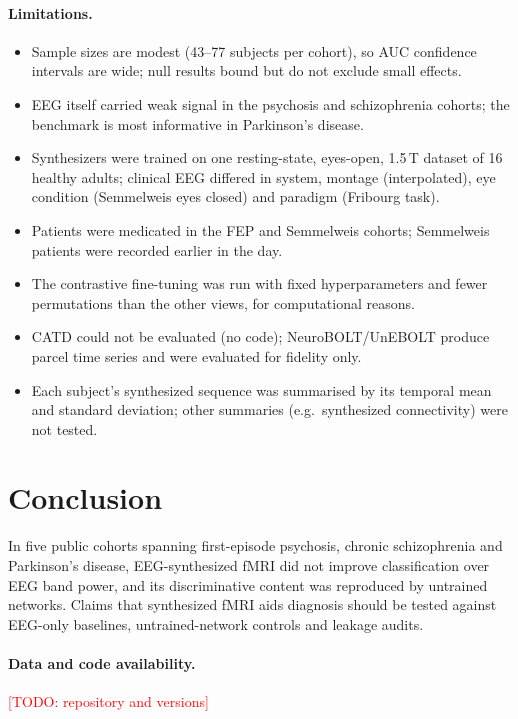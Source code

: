 \documentclass[11pt]{article}
\newcommand{\todo}[1]{\textcolor{red}{[TODO: #1]}}
\begin{document}
\paragraph{Limitations.}
\begin{itemize}
\item Sample sizes are modest (43--77 subjects per cohort), so AUC confidence intervals are wide; null results bound but do not exclude small effects.
\item EEG itself carried weak signal in the psychosis and schizophrenia cohorts; the benchmark is most informative in Parkinson's disease.
\item Synthesizers were trained on one resting-state, eyes-open, 1.5\,T dataset of 16 healthy adults; clinical EEG differed in system, montage (interpolated), eye condition (Semmelweis eyes closed) and paradigm (Fribourg task).
\item Patients were medicated in the FEP and Semmelweis cohorts; Semmelweis patients were recorded earlier in the day.
\item The contrastive fine-tuning was run with fixed hyperparameters and fewer permutations than the other views, for computational reasons.
\item CATD could not be evaluated (no code); NeuroBOLT/UnEBOLT produce parcel time series and were evaluated for fidelity only.
\item Each subject's synthesized sequence was summarised by its temporal mean and standard deviation; other summaries (e.g.\ synthesized connectivity) were not tested.
\end{itemize}

\section{Conclusion}
In five public cohorts spanning first-episode psychosis, chronic schizophrenia and Parkinson's disease, EEG-synthesized fMRI did not improve classification over EEG band power, and its discriminative content was reproduced by untrained networks.
Claims that synthesized fMRI aids diagnosis should be tested against EEG-only baselines, untrained-network controls and leakage audits.

\paragraph{Data and code availability.} \todo{repository and versions}



\end{document}
